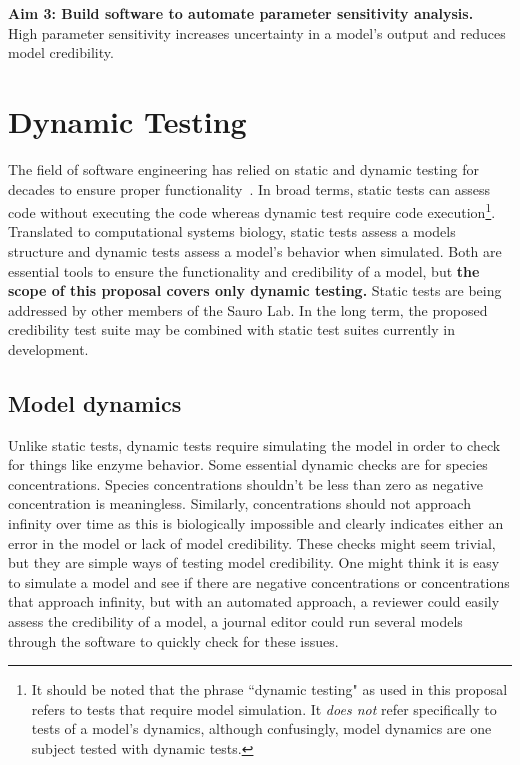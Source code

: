 \documentclass[12pt]{report}
\begin{document}
\textbf{Aim 3: Build software to automate parameter sensitivity analysis.}\\
High parameter sensitivity increases uncertainty in a model's output and reduces model credibility.


\chapter{Dynamic Testing}
The field of software engineering has relied on static and dynamic testing for decades to ensure proper functionality~\cite{Fairley78}. In broad terms, static tests can assess code without executing the code whereas dynamic test require code execution\footnote{ It should be noted that the phrase ``dynamic testing" as used in this proposal refers to tests that require model simulation. It \textit{does not} refer specifically to tests of a model's dynamics, although confusingly, model dynamics are one subject tested with dynamic tests. }. Translated to computational systems biology, static tests assess a models structure and dynamic tests assess a model's behavior when simulated. Both are essential tools to ensure the functionality and credibility of a model, but \textbf{the scope of this proposal covers only dynamic testing.} Static tests are being addressed by other members of the Sauro Lab. In the long term, the proposed credibility test suite may be combined with static test suites currently in development.






\section{Model dynamics}
Unlike static tests, dynamic tests require simulating the model in order to check for things like enzyme behavior. Some essential dynamic checks are for species concentrations. Species concentrations shouldn't be less than zero as negative concentration is meaningless. Similarly, concentrations should not approach infinity over time as this is biologically impossible and clearly indicates either an error in the model or lack of model credibility. These checks might seem trivial, but they are simple ways of testing model credibility. One might think it is easy to simulate a model and see if there are negative concentrations or concentrations that approach infinity, but with an automated approach, a reviewer could easily assess the credibility of a model, a journal editor could run several models through the software to quickly check for these issues.
\end{document}
